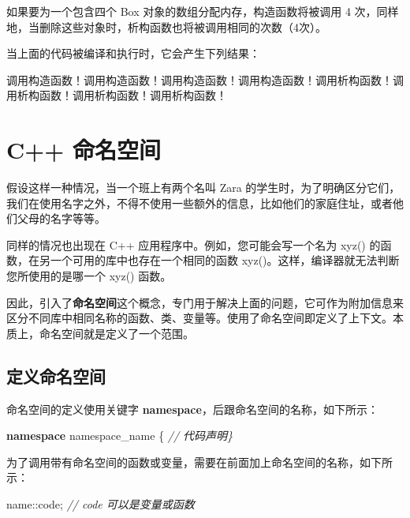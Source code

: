 \documentclass[
]{article}
\newenvironment{Shaded}{}{}
\newcommand{\CommentTok}[1]{\textcolor[rgb]{0.38,0.63,0.69}{\textit{#1}}}
\newcommand{\KeywordTok}[1]{\textcolor[rgb]{0.00,0.44,0.13}{\textbf{#1}}}
\newcommand{\NormalTok}[1]{#1}
\newcommand{\OperatorTok}[1]{\textcolor[rgb]{0.40,0.40,0.40}{#1}}
\begin{document}
如果要为一个包含四个 Box 对象的数组分配内存，构造函数将被调用 4
次，同样地，当删除这些对象时，析构函数也将被调用相同的次数（4次）。

当上面的代码被编译和执行时，它会产生下列结果：

\begin{Shaded}
\begin{Highlighting}[]
\NormalTok{调用构造函数！调用构造函数！调用构造函数！调用构造函数！调用析构函数！调用析构函数！调用析构函数！调用析构函数！}
\end{Highlighting}
\end{Shaded}

\hypertarget{c-ux547dux540dux7a7aux95f4}{%
\section{C++ 命名空间}\label{c-ux547dux540dux7a7aux95f4}}

假设这样一种情况，当一个班上有两个名叫 Zara
的学生时，为了明确区分它们，我们在使用名字之外，不得不使用一些额外的信息，比如他们的家庭住址，或者他们父母的名字等等。

同样的情况也出现在 C++ 应用程序中。例如，您可能会写一个名为 xyz()
的函数，在另一个可用的库中也存在一个相同的函数
xyz()。这样，编译器就无法判断您所使用的是哪一个 xyz() 函数。

因此，引入了\textbf{命名空间}这个概念，专门用于解决上面的问题，它可作为附加信息来区分不同库中相同名称的函数、类、变量等。使用了命名空间即定义了上下文。本质上，命名空间就是定义了一个范围。

\hypertarget{ux5b9aux4e49ux547dux540dux7a7aux95f4}{%
\subsection{定义命名空间}\label{ux5b9aux4e49ux547dux540dux7a7aux95f4}}

命名空间的定义使用关键字
\textbf{namespace}，后跟命名空间的名称，如下所示：

\begin{Shaded}
\begin{Highlighting}[]
\KeywordTok{namespace}\NormalTok{ namespace\_name }\OperatorTok{\{}   \CommentTok{// 代码声明\}}
\end{Highlighting}
\end{Shaded}

为了调用带有命名空间的函数或变量，需要在前面加上命名空间的名称，如下所示：

\begin{Shaded}
\begin{Highlighting}[]
\NormalTok{name}\OperatorTok{::}\NormalTok{code}\OperatorTok{;}  \CommentTok{// code 可以是变量或函数}
\end{Highlighting}
\end{Shaded}
\end{document}
